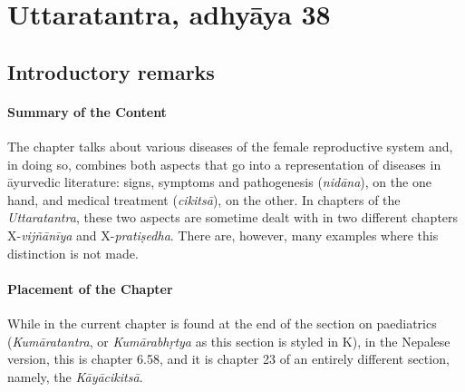 
\section{Uttaratantra, adhyāya 38}

\subsection*{Introductory remarks}

\paragraph*{Summary of the Content}
The chapter talks about various diseases of the female reproductive system and, in doing so, combines both aspects that go into a representation of diseases in āyurvedic literature: signs, symptoms and pathogenesis (\textit{nidāna}), on the one hand, and medical treatment (\textit{cikitsā}), on the other. In chapters of the \textit{Uttaratantra}, these two aspects are sometime dealt with in two different chapters X-\textit{vijñānīya} and X-\textit{pratiṣedha}. There are, however, many examples where this distinction is not made. 


\paragraph*{Placement of the Chapter}
While in \cite{vulgate} the current chapter is found at the end of the section on paediatrics (\textit{Kumāratantra}, or \textit{Kumārabhṛtya} as this section is styled in K), in the Nepalese version, this is chapter 6.58, and it is chapter 23 of an entirely different section, namely, the \textit{Kāyācikitsā}.

